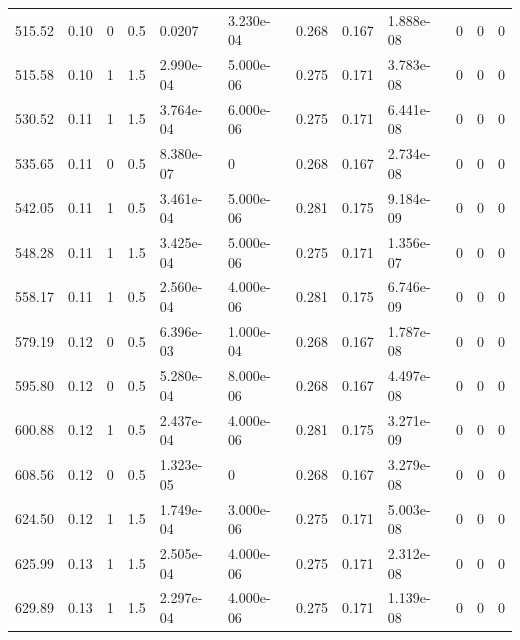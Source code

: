 \documentclass[preview]{standalone}
\begin{document}
{{\begin{tabular}{L{1.2cm}C{1.2cm} C{0.3cm}C{0.5cm} C{1.4cm}C{1.4cm} C{1.4cm}C{1.4cm} C{1.6cm}C{1.6cm} C{1.6cm}C{1.6cm}}
  515.52  &  0.10  & 0     & 0.5 &  0.0207  & 3.230e-04  &  0.268&   0.167& 1.888e-08 & 0   &  0 & 0  \\ 
  515.58  &  0.10  & 1     & 1.5 &  2.990e-04  & 5.000e-06  &  0.275&   0.171& 3.783e-08 & 0   &  0 & 0  \\ 
  530.52  &  0.11  & 1     & 1.5 &  3.764e-04  & 6.000e-06  &  0.275&   0.171& 6.441e-08 & 0   &  0 & 0  \\ 
  535.65  &  0.11  & 0     & 0.5 &  8.380e-07  & 0  &  0.268&   0.167& 2.734e-08 & 0   &  0 & 0  \\ 
  542.05  &  0.11  & 1     & 0.5 &  3.461e-04  & 5.000e-06  &  0.281&   0.175& 9.184e-09 & 0   &  0 & 0  \\ 
  548.28  &  0.11  & 1     & 1.5 &  3.425e-04  & 5.000e-06  &  0.275&   0.171& 1.356e-07 & 0   &  0 & 0  \\ 
  558.17  &  0.11  & 1     & 0.5 &  2.560e-04  & 4.000e-06  &  0.281&   0.175& 6.746e-09 & 0   &  0 & 0  \\ 
  579.19  &  0.12  & 0     & 0.5 &  6.396e-03  & 1.000e-04  &  0.268&   0.167& 1.787e-08 & 0   &  0 & 0  \\ 
  595.80  &  0.12  & 0     & 0.5 &  5.280e-04  & 8.000e-06  &  0.268&   0.167& 4.497e-08 & 0   &  0 & 0  \\ 
  600.88  &  0.12  & 1     & 0.5 &  2.437e-04  & 4.000e-06  &  0.281&   0.175& 3.271e-09 & 0   &  0 & 0  \\ 
  608.56  &  0.12  & 0     & 0.5 &  1.323e-05  & 0  &  0.268&   0.167& 3.279e-08 & 0   &  0 & 0  \\ 
  624.50  &  0.12  & 1     & 1.5 &  1.749e-04  & 3.000e-06  &  0.275&   0.171& 5.003e-08 & 0   &  0 & 0  \\ 
  625.99  &  0.13  & 1     & 1.5 &  2.505e-04  & 4.000e-06  &  0.275&   0.171& 2.312e-08 & 0   &  0 & 0  \\ 
  629.89  &  0.13  & 1     & 1.5 &  2.297e-04  & 4.000e-06  &  0.275&   0.171& 1.139e-08 & 0   &  0 & 0  \\ 
\hline 
\end{tabular} 

}}
\end{document}
